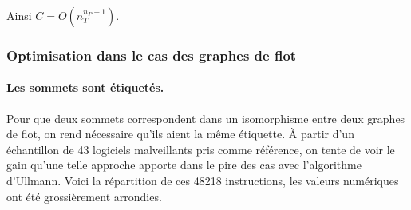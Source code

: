 \begin{pr}
Ainsi $C=O(n_T^{n_P+1})$.
\end{pr}



\subsubsection{Optimisation dans le cas des graphes de flot\label{sec:ullmann_optimisation}}
\paragraph{Les sommets sont étiquetés.}
Pour que deux sommets correspondent dans un isomorphisme entre deux graphes de flot, on rend nécessaire qu'ils aient la même étiquette.
À partir d'un échantillon de 43 logiciels malveillants pris comme référence, on tente de voir le gain qu'une telle approche apporte dans le pire des cas avec l'algorithme d'Ullmann.
Voici la répartition de ces 48218 instructions, les valeurs numériques ont été grossièrement arrondies.

